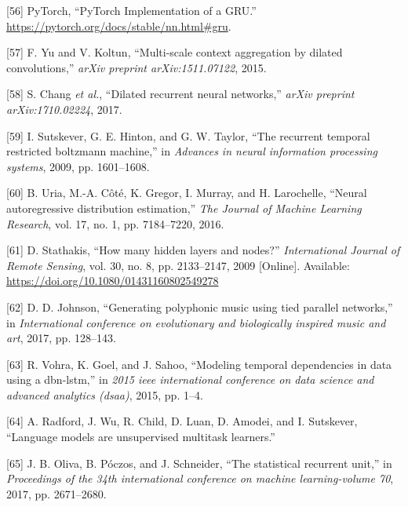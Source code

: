 \documentclass[12pt,]{article}
\begin{document}
\leavevmode\hypertarget{ref-pytorchgru}{}%
{[}56{]} \relax PyTorch, ``PyTorch Implementation of a GRU.'' \\
\url{https://pytorch.org/docs/stable/nn.html\#gru}.

\leavevmode\hypertarget{ref-yu2015multi}{}%
{[}57{]} F. Yu and V. Koltun, ``Multi-scale context aggregation by
dilated convolutions,'' \emph{arXiv preprint arXiv:1511.07122}, 2015.

\leavevmode\hypertarget{ref-chang2017dilated}{}%
{[}58{]} S. Chang \emph{et al.}, ``Dilated recurrent neural networks,''
\emph{arXiv preprint arXiv:1710.02224}, 2017.

\leavevmode\hypertarget{ref-sutskever2009recurrent}{}%
{[}59{]} I. Sutskever, G. E. Hinton, and G. W. Taylor, ``The recurrent
temporal restricted boltzmann machine,'' in \emph{Advances in neural
information processing systems}, 2009, pp. 1601--1608.

\leavevmode\hypertarget{ref-uria2016neural}{}%
{[}60{]} B. Uria, M.-A. Côté, K. Gregor, I. Murray, and H. Larochelle,
``Neural autoregressive distribution estimation,'' \emph{The Journal of
Machine Learning Research}, vol. 17, no. 1, pp. 7184--7220, 2016.

\leavevmode\hypertarget{ref-doi10108001431160802549278}{}%
{[}61{]} D. Stathakis, ``How many hidden layers and nodes?''
\emph{International Journal of Remote Sensing}, vol. 30, no. 8, pp.
2133--2147, 2009 {[}Online{]}. Available:
\url{https://doi.org/10.1080/01431160802549278}

\leavevmode\hypertarget{ref-johnson2017generating}{}%
{[}62{]} D. D. Johnson, ``Generating polyphonic music using tied
parallel networks,'' in \emph{International conference on evolutionary
and biologically inspired music and art}, 2017, pp. 128--143.

\leavevmode\hypertarget{ref-vohra2015modeling}{}%
{[}63{]} R. Vohra, K. Goel, and J. Sahoo, ``Modeling temporal
dependencies in data using a dbn-lstm,'' in \emph{2015 ieee
international conference on data science and advanced analytics (dsaa)},
2015, pp. 1--4.

\leavevmode\hypertarget{ref-radford2018language}{}%
{[}64{]} A. Radford, J. Wu, R. Child, D. Luan, D. Amodei, and I.
Sutskever, ``Language models are unsupervised multitask learners.''

\leavevmode\hypertarget{ref-oliva2017statistical}{}%
{[}65{]} J. B. Oliva, B. Póczos, and J. Schneider, ``The statistical
recurrent unit,'' in \emph{Proceedings of the 34th international
conference on machine learning-volume 70}, 2017, pp. 2671--2680.
\end{document}
